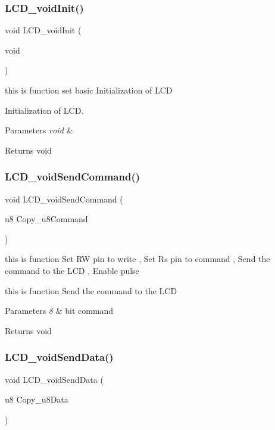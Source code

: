 \subsubsection{LCD\_voidInit()}
{\footnotesize\ttfamily void L\+C\+D\+\_\+void\+Init (\begin{DoxyParamCaption}\item[{void}]{ }\end{DoxyParamCaption})}



this is function set basic Initialization of L\+CD 

Initialization of L\+CD.


\begin{DoxyParams}{Parameters}
{\em void} & \\
\hline
\end{DoxyParams}
\begin{DoxyReturn}{Returns}
void 
\end{DoxyReturn}
\mbox{\label{_l_c_d__program_8c_a8e2918471a3b4ad25ffd14a814e08c9e}} 
\subsubsection{LCD\_voidSendCommand()}
{\footnotesize\ttfamily void L\+C\+D\+\_\+void\+Send\+Command (\begin{DoxyParamCaption}\item[{u8}]{Copy\+\_\+u8\+Command }\end{DoxyParamCaption})}



this is function Set RW pin to write , Set Rs pin to command , Send the command to the L\+CD , Enable pulse 

this is function Send the command to the L\+CD


\begin{DoxyParams}{Parameters}
{\em 8} & bit command\\
\hline
\end{DoxyParams}
\begin{DoxyReturn}{Returns}
void 
\end{DoxyReturn}
\mbox{\label{_l_c_d__program_8c_a6e31083c0cb3e71bcb1a5b4a3986a7f1}} 
\subsubsection{LCD\_voidSendData()}
{\footnotesize\ttfamily void L\+C\+D\+\_\+void\+Send\+Data (\begin{DoxyParamCaption}\item[{u8}]{Copy\+\_\+u8\+Data }\end{DoxyParamCaption})}




